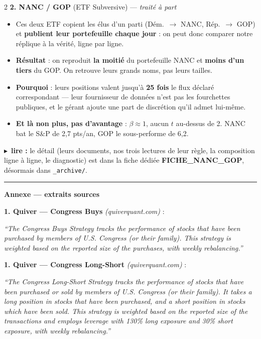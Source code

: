 \documentclass[9pt,a4paper]{extarticle}
\newcommand{\lire}[1]{{\scriptsize\color{vert}$\blacktriangleright$~\textbf{lire :} #1}\par}
\newenvironment{pts}{\begin{itemize}[leftmargin=3.4mm,itemsep=0.2mm,topsep=0.4mm,parsep=0pt,label={\color{bleu}\footnotesize\textbullet}]}{\end{itemize}}
\begin{document}
\begin{multicols}{2}
\textbf{2. NANC / GOP} (ETF Subversive) --- \emph{traité à part}
\begin{pts}
\item Ces deux ETF copient les élus d'un parti (Dém.\ $\to$ NANC, Rép.\ $\to$ GOP) et \textbf{publient leur portefeuille chaque jour} : on peut donc comparer notre réplique à la vérité, ligne par ligne.
\item \textbf{Résultat} : on reproduit \textbf{la moitié} du portefeuille NANC et \textbf{moins d'un tiers} du GOP. On retrouve leurs grands noms, pas leurs tailles.
\item \textbf{Pourquoi} : leurs positions valent jusqu'à \textbf{25 fois} le flux déclaré correspondant --- leur fournisseur de données n'est pas les fourchettes publiques, et le gérant ajoute une part de discrétion qu'il admet lui-même.
\item \textbf{Et là non plus, pas d'avantage} : $\beta\approx1$, aucun $t$ au-dessus de 2. NANC bat le S\&P de 2,7 pts/an, GOP le sous-performe de 6,2.
\end{pts}
\lire{le détail (leurs documents, nos trois lectures de leur règle, la composition ligne à ligne, le diagnostic) est dans la fiche dédiée \textbf{FICHE\_NANC\_GOP}, désormais dans \texttt{\_archive/}.}
\end{multicols}

\vspace{2mm}\hrule\vspace{1.5mm}
{\color{bleu}\bfseries\large Annexe --- extraits sources}\par\vspace{2mm}

\textbf{1. Quiver --- Congress Buys} \emph{(quiverquant.com)} :
{\footnotesize\itshape ``The Congress Buys Strategy tracks the performance of stocks that have been purchased by members of U.S. Congress (or their family). This strategy is weighted based on the reported size of the purchases, with weekly rebalancing.''\par}
\vspace{1.5mm}

\textbf{1. Quiver --- Congress Long-Short} \emph{(quiverquant.com)} :
{\footnotesize\itshape ``The Congress Long-Short Strategy tracks the performance of stocks that have been purchased or sold by members of U.S. Congress (or their family). It takes a long position in stocks that have been purchased, and a short position in stocks which have been sold. This strategy is weighted based on the reported size of the transactions and employs leverage with 130\% long exposure and 30\% short exposure, with weekly rebalancing.''\par}
\vspace{2mm}
\end{document}
